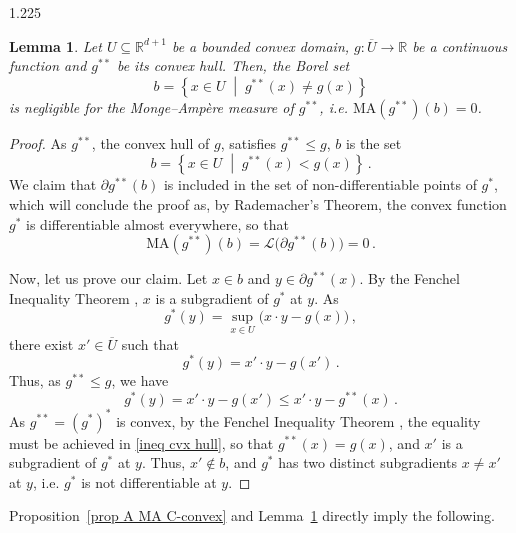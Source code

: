 \documentclass[reqno, a4paper]{amsart}
\numberwithin{equation}{section}
\numberwithin{figure}{section}
\newtheorem{lemma}[theorem]{Lemma}
\theoremstyle{definition}
\theoremstyle{remark}
\newcommand{\R}{\mathbb{R}} %
\newcommand{\MA}{\mathrm{MA}} %
\newcommand{\st}{\; \middle\vert \;} %
\newcommand{\bp}[1]{{\bigl( {#1} \bigr)}} %
\begin{document}
\begin{spacing}{1.225}
\begin{lemma}
\label{prop MA and cvx hull}
 Let $U \subseteq \R^{d+1}$ be a bounded convex domain, $g: \overline{U} \to \R$ be a continuous function and $g^{**}$ be its convex hull. Then, the Borel set
 \begin{equation*}
 b = \left\lbrace x \in U \st g^{**}(x) \neq g(x)\right\rbrace
 \end{equation*}
is negligible for the Monge--Amp\`ere measure of $g^{**}$, i.e. $\MA(g^{**})(b) = 0$. 
\end{lemma}
\begin{proof}
As $g^{**}$, the convex hull of $g$, satisfies $g^{**} \leq g$, $b$ is the set
\begin{equation*}
 b = \left\lbrace x \in U \st g^{**}(x)<g(x)\right\rbrace \, . 
 \end{equation*}
We claim that $\partial g^{**}(b)$ is included in the set of non-differentiable points of $g^*$, which will conclude the proof as, by Rademacher's Theorem, the convex function $g^*$ is differentiable almost everywhere, so that 
 \begin{equation*}
 \MA(g^{**})(b)=\mathcal{L}\bp{\partial g^{**}(b)}= 0\, . 
 \end{equation*}
 
Now, let us prove our claim. Let $x \in b$ and $y \in \partial g^{**}(x)$. By the Fenchel Inequality Theorem \cite[Theorem~23.5]{Rockafellar_97}, $x$ is a subgradient of $g^*$ at $y$. As
 \begin{equation*}
 g^*(y) = \sup_{x \in U} \bp{x \cdot y -g(x)} \, , 
 \end{equation*}
 there exist $x' \in \overline{U}$ such that 
 \begin{equation*}
 g^*(y) = x' \cdot y - g(x') \, . 
 \end{equation*}
 Thus, as $g^{**} \leq g$, we have
 \begin{equation}
 \label{ineq cvx hull}
 g^*(y) = x' \cdot y - g(x') \leq x' \cdot y - g^{**}(x) \, . 
 \end{equation}
 As $g^{**} = (g^*)^*$ is convex, by the Fenchel Inequality Theorem \cite[Theorem~23.5]{Rockafellar_97}, the equality must be achieved in \eqref{ineq cvx hull}, so that $g^{**}(x)=g(x)$, and $x'$ is a subgradient of $g^*$ at $y$. Thus, $x' \notin b$, and $g^*$ has two distinct subgradients $x \neq x'$ at $y$, i.e. $g^*$ is not differentiable at $y$. 
\end{proof}

Proposition~\ref{prop A MA C-convex} and Lemma~\ref{prop MA and cvx hull} directly imply the following. 


\end{spacing}
\end{document}
